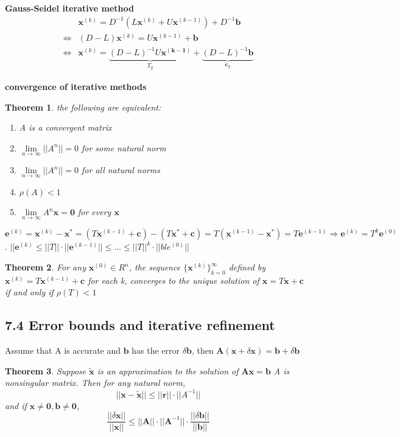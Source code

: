 \documentclass[11pt]{article}
\newtheorem{theorem}{Theorem}[section]
\newcommand{\bl}[1] {\boldsymbol{#1}}
\begin{document}
\textbf{Gauss-Seidel iterative method}
\begin{align*}
&\bl{x}^{(k)}=D^{-1}(L\bl{x}^{(k)}+U\bl{x}^{(k-1)})+D^{-1}\bl{b}\\
\Leftrightarrow&(D-L)\bl{x}^{(k)}=U\bl{x}^{(k-1)}+\bl{b}\\
\Leftrightarrow&\bl{x}^{(k)}=\underbrace{(D-L)^{-1}U\bl{x^{(k-1)}}}_{T_g}
+\underbrace{(D-L)^{-1}\bl{b}}_{\bl{c}_g}
\end{align*}


\textbf{convergence of iterative methods}
\begin{theorem}
the following are equivalent:
\begin{enumerate}
\item A is a convergent matrix
\item $\lim\limits_{n\to\infty}||A^n|| = 0$ for some natural norm
\item $\lim\limits_{n\to\infty}||A^n||=0$ for all natural norms
\item $\rho(A)<1$
\item $\lim\limits_{n\to\infty}A^n\bl{x}=\bl{0}$ for every $\bl{x}$
\end{enumerate}
\end{theorem}

\(\bl{e}^{(k)}=\bl{x}^{(k)}-\bl{x}^*=(T\bl{x}^{(k-1)}+\bl{c})-(T\bl{x}^*+\bl{c})
   =T(\bl{x}^{(k-1)}-\bl{x}^*)=T\bl{e}^{(k-1)}\Rightarrow\bl{e}^{(k)}=T^k\bl{e}^{(0)}\).
\(||\bl{e}^{(k)}\le||T||\cdot||\bl{e}^{(k-1)}||\le\dots\le||T||^k\cdot||bl{e}^{(0)}||\)

\begin{theorem}
For any $\bl{x}^{(0)}\in R^n$, the sequence $\{\bl{x}^{(k)}\}_{k=0}^\infty$
defined by $\bl{x}^{(k)}=T\bl{x}^{(k-1)}+\bl{c}$ for each k, converges to the
unique solution of $\bl{x}=T\bl{x}+\bl{c}$ if and only if $\rho(T)<1$
\end{theorem}
\subsection{7.4 Error bounds and iterative refinement}
\label{sec:orge496d2f}
Assume that A is accurate and \(\bl{b}\) has the error \(\delta \bl{b}\),
then \(\bl{A}(\bl{x}+\delta \bl{x})=\bl{b}+\delta \bl{b}\)

\begin{theorem}
Suppose $\tilde{\bl{x}}$ is an approximation to the solution of $ \bl{Ax=b}$
A is nonsingular matrix. Then for any natural norm,
\begin{equation*}
||\bl{x-\tilde{x}}||\le||\bl{r}||\cdot||A^{-1}||
\end{equation*}
and if $ \bl{x\neq 0, b\neq 0}$,
\begin{equation*}
\frac{||\delta\bl{x}||}{||\bl{x}||}\le||\bl{A}
||\cdot||\bl{A}^{-1}||\cdot \frac{||\delta\bl{b}||}{||\bl{b}||}
\end{equation*}
\end{theorem}
\end{document}
